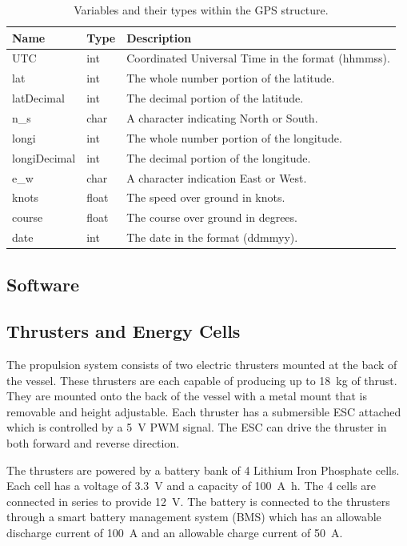 		\begin{table}[!hb]
			\begin{center}
				\caption{Variables and their types within the GPS structure.}
				\label{tab:3:GPSstruct}
				\begin{tabular}{|l|l|l|}
					\hline
					\textbf{Name} & \textbf{Type} & \textbf{Description} \\
					\hline
					UTC & int & Coordinated Universal Time in the format (hhmmss). \\
					\hline
					lat & int & The whole number portion of the latitude. \\
					\hline
					latDecimal & int & The decimal portion of the latitude. \\
					\hline
					n\_s & char & A character indicating North or South. \\
					\hline
					longi & int & The whole number portion of the longitude. \\
					\hline 
					longiDecimal & int & The decimal portion of the longitude. \\
					\hline 
					e\_w & char & A character indication East or West. \\
					\hline
					knots & float & The speed over ground in knots. \\
					\hline
					course & float & The course over ground in degrees. \\
					\hline
					date & int & The date in the format (ddmmyy). \\
					\hline
				\end{tabular}
			\end{center}
		\end{table}
	\subsection{Software}

\subsection{Thrusters and Energy Cells}
The propulsion system consists of two electric thrusters mounted at the back of the vessel. These thrusters are each capable of producing up to \SI{18}{\kilogram} of thrust. They are mounted onto the back of the vessel with a metal mount that is removable and height adjustable. Each thruster has a submersible ESC attached which is controlled by a \SI{5}{\volt} PWM signal. The ESC can drive the thruster in both forward and reverse direction.\par
\vspace{0.4cm}
The thrusters are powered by a battery bank of 4 Lithium Iron Phosphate cells. Each cell has a voltage of \SI{3.3}{\volt} and a capacity of \SI{100}{\ampere\hour}. The 4 cells are connected in series to provide \SI{12}{\volt}. The battery is connected to the thrusters through a smart battery management system (BMS) which has an allowable discharge current of \SI{100}{\ampere} and an allowable charge current of \SI{50}{\ampere}.
